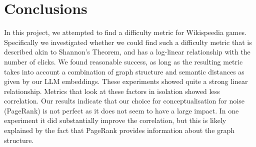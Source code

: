\section{Conclusions}
\label{sec:conclusions}
In this project, we attempted to find a difficulty metric for Wikispeedia games. Specifically we investigated whether we could find such a difficulty metric that is described akin to Shannon's Theorem, and has a log-linear relationship with the number of clicks. We found reasonable success, as long as the resulting metric takes into account a combination of graph structure and semantic distances as given by our LLM embeddings. These experiments showed quite a strong linear relationship. Metrics that look at these factors in isolation showed less correlation. Our results indicate that our choice for conceptualisation for noise (PageRank) is not perfect as it does not seem to have a large impact. In one experiment it did substantially improve the correlation, but this is likely explained by the fact that PageRank provides information about the graph structure.


